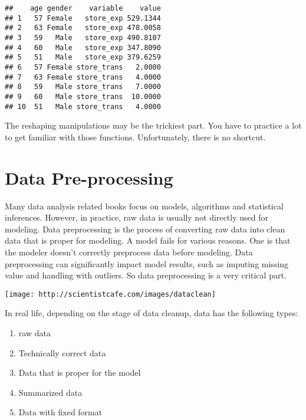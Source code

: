 \documentclass[
]{article}
\newenvironment{Shaded}{\begin{snugshade}}{\end{snugshade}}
\newcommand{\DataTypeTok}[1]{\textcolor[rgb]{0.13,0.29,0.53}{#1}}
\newcommand{\KeywordTok}[1]{\textcolor[rgb]{0.13,0.29,0.53}{\textbf{#1}}}
\newcommand{\NormalTok}[1]{#1}
\newcommand{\OperatorTok}[1]{\textcolor[rgb]{0.81,0.36,0.00}{\textbf{#1}}}
\newcommand{\StringTok}[1]{\textcolor[rgb]{0.31,0.60,0.02}{#1}}
\providecommand{\tightlist}{%
  \setlength{\itemsep}{0pt}\setlength{\parskip}{0pt}}
\begin{document}
\begin{Shaded}
\end{Shaded}

\begin{verbatim}
##    age gender    variable    value
## 1   57 Female   store_exp 529.1344
## 2   63 Female   store_exp 478.0058
## 3   59   Male   store_exp 490.8107
## 4   60   Male   store_exp 347.8090
## 5   51   Male   store_exp 379.6259
## 6   57 Female store_trans   2.0000
## 7   63 Female store_trans   4.0000
## 8   59   Male store_trans   7.0000
## 9   60   Male store_trans  10.0000
## 10  51   Male store_trans   4.0000
\end{verbatim}

The reshaping manipulations may be the trickiest part. You have to
practice a lot to get familiar with those functions. Unfortunately,
there is no shortcut.

\hypertarget{data-pre-processing}{%
\section{Data Pre-processing}\label{data-pre-processing}}

Many data analysis related books focus on models, algorithms and
statistical inferences. However, in practice, raw data is usually not
directly used for modeling. Data preprocessing is the process of
converting raw data into clean data that is proper for modeling. A model
fails for various reasons. One is that the modeler doesn't correctly
preprocess data before modeling. Data preprocessing can significantly
impact model results, such as imputing missing value and handling with
outliers. So data preprocessing is a very critical part.

\begin{center}\texttt{[image: http://scientistcafe.com/images/dataclean]} \end{center}

In real life, depending on the stage of data cleanup, data has the
following types:

\begin{enumerate}
\def\labelenumi{\arabic{enumi}.}
\tightlist
\item
  raw data
\item
  Technically correct data
\item
  Data that is proper for the model
\item
  Summarized data
\item
  Data with fixed format
\end{enumerate}
\end{document}
